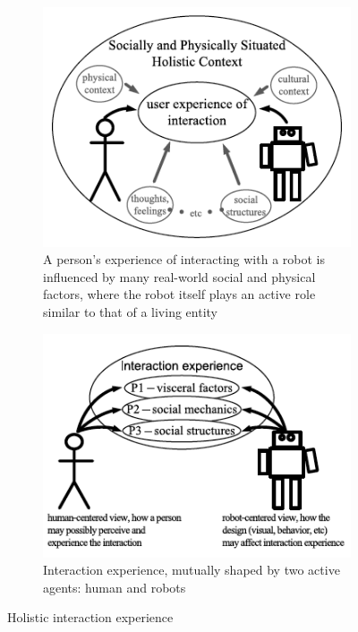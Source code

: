 \begin{figure}[H]
\centering
\begin{subfigure}[b]{0.4\textwidth}
\includegraphics[width=\textwidth]{assets/holistic_view.png}
\caption{A person’s experience of interacting with a robot is influenced
by many real-world social and physical factors, where the robot itself
plays an active role similar to that of a living entity}
\label{fig:holistic_view}
\end{subfigure}%
\hfill
\begin{subfigure}[b]{0.5\textwidth}
\includegraphics[width=\textwidth]{assets/holistic_interaction_map.png}
\caption{Interaction experience, mutually shaped by two active agents:
human and robots}
\label{fig:holistic_map}
\end{subfigure}%
\caption{Holistic interaction experience}
\label{fig:holistic}
\end{figure}

